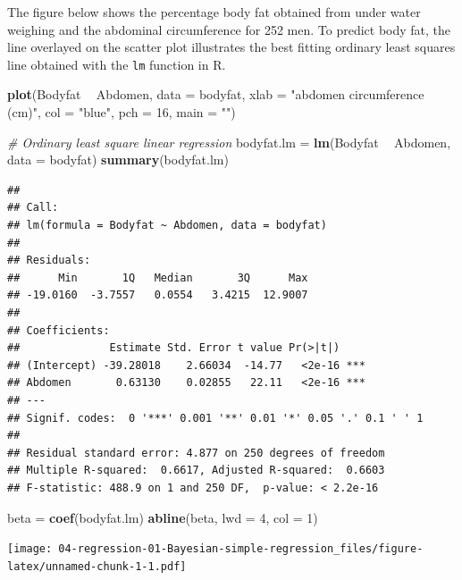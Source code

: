 \documentclass[]{book}
\newenvironment{Shaded}{\begin{snugshade}}{\end{snugshade}}
\newcommand{\KeywordTok}[1]{\textcolor[rgb]{0.13,0.29,0.53}{\textbf{#1}}}
\newcommand{\DataTypeTok}[1]{\textcolor[rgb]{0.13,0.29,0.53}{#1}}
\newcommand{\DecValTok}[1]{\textcolor[rgb]{0.00,0.00,0.81}{#1}}
\newcommand{\StringTok}[1]{\textcolor[rgb]{0.31,0.60,0.02}{#1}}
\newcommand{\CommentTok}[1]{\textcolor[rgb]{0.56,0.35,0.01}{\textit{#1}}}
\newcommand{\OperatorTok}[1]{\textcolor[rgb]{0.81,0.36,0.00}{\textbf{#1}}}
\newcommand{\NormalTok}[1]{#1}
\theoremstyle{definition}
\theoremstyle{definition}
\theoremstyle{definition}
\theoremstyle{remark}
\begin{document}
The figure below shows the percentage body fat obtained from under water
weighing and the abdominal circumference for 252 men. To predict body
fat, the line overlayed on the scatter plot illustrates the best fitting
ordinary least squares line obtained with the \texttt{lm} function in R.

\begin{Shaded}
\begin{Highlighting}[]
\KeywordTok{plot}\NormalTok{(Bodyfat }\OperatorTok{~}\StringTok{ }\NormalTok{Abdomen, }\DataTypeTok{data =}\NormalTok{ bodyfat, }
     \DataTypeTok{xlab =} \StringTok{"abdomen circumference (cm)"}\NormalTok{, }
     \DataTypeTok{col =} \StringTok{"blue"}\NormalTok{, }\DataTypeTok{pch =} \DecValTok{16}\NormalTok{, }\DataTypeTok{main =} \StringTok{""}\NormalTok{)}

\CommentTok{# Ordinary least square linear regression}
\NormalTok{bodyfat.lm =}\StringTok{ }\KeywordTok{lm}\NormalTok{(Bodyfat }\OperatorTok{~}\StringTok{ }\NormalTok{Abdomen, }\DataTypeTok{data =}\NormalTok{ bodyfat)}
\KeywordTok{summary}\NormalTok{(bodyfat.lm)}
\end{Highlighting}
\end{Shaded}

\begin{verbatim}
## 
## Call:
## lm(formula = Bodyfat ~ Abdomen, data = bodyfat)
## 
## Residuals:
##      Min       1Q   Median       3Q      Max 
## -19.0160  -3.7557   0.0554   3.4215  12.9007 
## 
## Coefficients:
##              Estimate Std. Error t value Pr(>|t|)    
## (Intercept) -39.28018    2.66034  -14.77   <2e-16 ***
## Abdomen       0.63130    0.02855   22.11   <2e-16 ***
## ---
## Signif. codes:  0 '***' 0.001 '**' 0.01 '*' 0.05 '.' 0.1 ' ' 1
## 
## Residual standard error: 4.877 on 250 degrees of freedom
## Multiple R-squared:  0.6617, Adjusted R-squared:  0.6603 
## F-statistic: 488.9 on 1 and 250 DF,  p-value: < 2.2e-16
\end{verbatim}

\begin{Shaded}
\begin{Highlighting}[]
\NormalTok{beta =}\StringTok{ }\KeywordTok{coef}\NormalTok{(bodyfat.lm)}
\KeywordTok{abline}\NormalTok{(beta, }\DataTypeTok{lwd =} \DecValTok{4}\NormalTok{, }\DataTypeTok{col =} \DecValTok{1}\NormalTok{)}
\end{Highlighting}
\end{Shaded}

\texttt{[image: 04-regression-01-Bayesian-simple-regression\_files/figure-latex/unnamed-chunk-1-1.pdf]}
\end{document}
